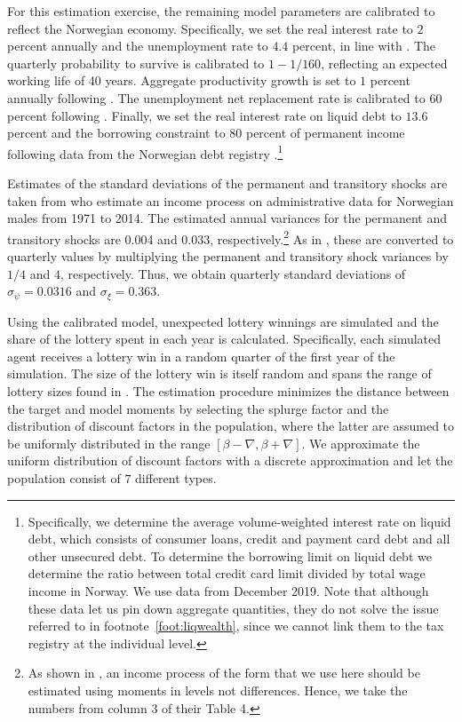 \documentclass[../HAFiscal]{subfiles}
\begin{document}
For this estimation exercise, the remaining model parameters are calibrated to reflect the Norwegian economy. Specifically, we set the real interest rate to $2$ percent annually and the unemployment rate to $4.4$ percent, in line with \citet{aursland_state-dependent_2020}. The quarterly probability to survive is calibrated to $1-1/160$, reflecting an expected working life of 40 years. Aggregate productivity growth is set to $1$ percent annually following \citet{kravik_navigating_2019}. The unemployment net replacement rate is calibrated to $60$ percent following \citet{oecd_net_2020}. Finally, we set the real interest rate on liquid debt to $13.6$ percent and the borrowing constraint to $80$ percent of permanent income following data from the Norwegian debt registry \citet{gjeldsregistret_nokkeltall_2022}.\footnote{Specifically, we determine the average volume-weighted interest rate on liquid debt, which consists of consumer loans, credit and payment card debt and all other unsecured debt. To determine the borrowing limit on liquid debt we determine the ratio between total credit card limit divided by total wage income in Norway. We use data from December 2019. Note that although these data let us pin down aggregate quantities, they do not solve the issue referred to in footnote~\ref{foot:liqwealth}, since we cannot link them to the tax registry at the individual level.}

Estimates of the standard deviations of the permanent and transitory shocks are taken from \citet{crawley2022parsimonious} who estimate an income process on administrative data for Norwegian males from 1971 to 2014. The estimated annual variances for the permanent and transitory shocks are 0.004 and 0.033, respectively.\footnote{As shown in \citet{crawley2022parsimonious}, an income process of the form that we use here should be estimated using moments in levels not differences. Hence, we take the numbers from column 3 of their Table 4.} As in \citet{carroll2020sticky}, these are converted to quarterly values by multiplying the permanent and transitory shock variances by $1/4$ and $4$, respectively. Thus, we obtain quarterly standard deviations of $\sigma_\psi=0.0316$ and $\sigma_\xi=0.363$.

Using the calibrated model, unexpected lottery winnings are simulated and the share of the lottery spent in each year is calculated. Specifically, each simulated agent receives a lottery win in a random quarter of the first year of the simulation. The size of the lottery win is itself random and spans the range of lottery sizes found in \citet{fagereng_mpc_2021}. The estimation procedure minimizes the distance between the target and model moments by selecting the splurge factor and the distribution of discount factors in the population, where the latter are assumed to be uniformly distributed in the range $[\beta-\nabla, \beta+\nabla]$. We approximate the uniform distribution of discount factors with a discrete approximation and let the population consist of $7$ different types.
\end{document}
